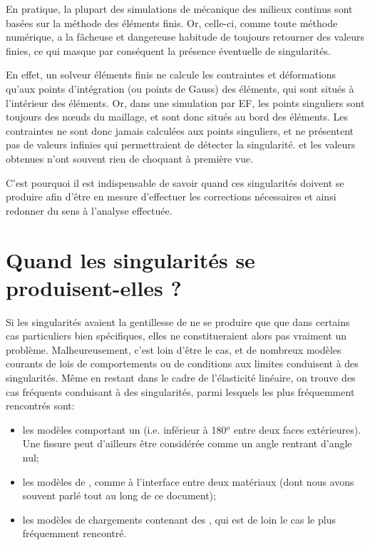 \medskip
En pratique, la plupart des simulations de mécanique des milieux continus sont basées sur la
méthode des éléments finis. Or, celle-ci, comme toute méthode numérique, a la fâcheuse
et dangereuse habitude de toujours retourner des valeurs finies, ce qui masque par conséquent la présence
éventuelle de singularités.

\medskip
En effet, un solveur éléments finis ne calcule les contraintes et déformations qu'aux points
d'intégration (ou points de Gauss) des éléments, qui sont situés à l'intérieur des éléments. 
Or, dans une simulation par EF, les points singuliers sont toujours des nœuds du
maillage, et sont donc situés au bord des éléments. Les contraintes ne sont donc jamais
calculées aux points singuliers, et ne présentent pas de valeurs infinies qui permettraient de
détecter la singularité.  et les valeurs obtenues n'ont souvent rien de choquant à première 
vue.

C'est pourquoi il est indispensable de savoir  quand ces singularités doivent se produire
afin d'être en mesure d'effectuer les corrections nécessaires et ainsi redonner du
sens à l'analyse effectuée.


\medskip
\section{Quand les singularités se produisent-elles ?}

Si les singularités avaient la gentillesse de ne se produire que que dans certains cas particuliers 
bien spécifiques, elles ne constitueraient alors pas vraiment un problème.
Malheureusement, c'est loin d'être le cas, et de nombreux modèles courants de
lois de comportements ou de conditions aux limites conduisent à des singularités. 
Même en restant dans le cadre de l'élasticité linéaire, on trouve des cas fréquents
conduisant à des singularités, parmi lesquels les plus fréquemment rencontrés sont:
\medskip
\begin{itemize}
   \item les modèles comportant un  (i.e. inférieur à
	180$^o$ entre deux faces extérieures). Une fissure peut d'ailleurs être considérée
	comme un angle rentrant d'angle nul;

   \item les modèles de , comme à
	l'interface entre deux matériaux (dont nous avons souvent parlé tout au long de ce 
	document);
   \item les modèles de chargements contenant des , qui est
	de loin le cas le plus fréquemment rencontré.
\end{itemize}

